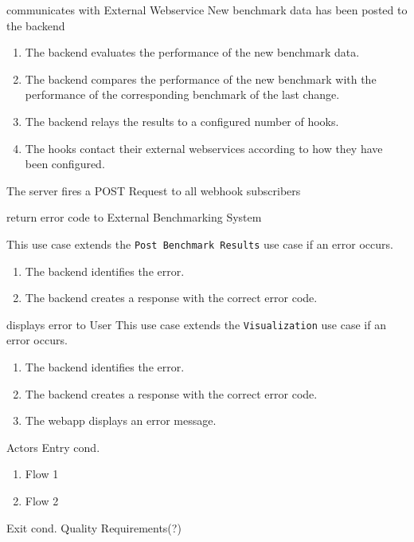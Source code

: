 \bigskip

{communicates with External Webservice}
{New benchmark data has been posted to the backend}
{\begin{enumerate}
    \item The backend evaluates the performance of the new benchmark data.
    \item The backend compares the performance of the new benchmark with the performance of the corresponding benchmark of the last change.
    \item The backend relays the results to a configured number of hooks.
    \item The hooks contact their external webservices according to how they have been configured.
\end{enumerate}}
{The server fires a POST Request to all webhook subscribers}
{}

\bigskip

{return error code to External Benchmarking System}
{}
{This use case extends the \texttt{Post Benchmark Results} use case if an error occurs.
\begin{enumerate}
    \item The backend identifies the error.
    \item The backend creates a response with the correct error code.
\end{enumerate}}
{}
{}

\bigskip

{displays error to User}
{This use case extends the \texttt{Visualization} use case if an error occurs.}
{\begin{enumerate}
    \item The backend identifies the error.
    \item The backend creates a response with the correct error code.
    \item The webapp displays an error message.
\end{enumerate}}
{}
{}

\bigskip

{Actors}
{Entry cond.}
{\begin{enumerate}
    \item Flow 1
    \item Flow 2
\end{enumerate}} 
{Exit cond.}
{Quality Requirements(?)}
